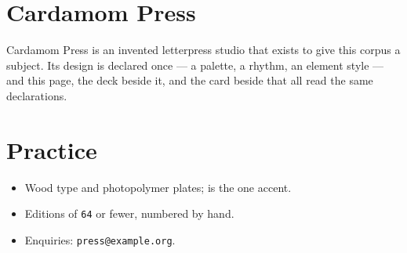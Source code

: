 \documentclass{article}
\begin{document}
\section{Cardamom Press}

Cardamom Press is an invented letterpress studio that exists to give this
corpus a subject. Its design is declared once — a palette, a rhythm, an
element style — and this page, the deck beside it, and the card beside
that all read the same declarations.

\section{Practice}

\begin{itemize}
  \item Wood type and photopolymer plates;  is the one accent.
  \item Editions of \texttt{64} or fewer, numbered by hand.
  \item Enquiries: \texttt{press@example.org}.
\end{itemize}
\end{document}
